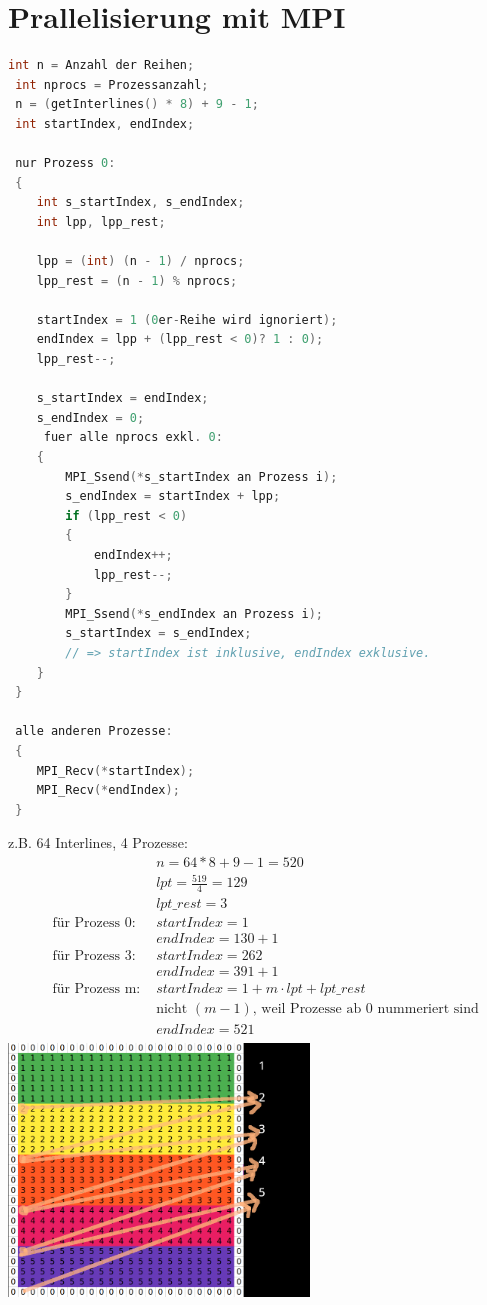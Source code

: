 \documentclass[a4paper,10pt]{article}
\begin{document}
\section{Prallelisierung mit MPI}

\begin{lstlisting}[language=C]
 int n = Anzahl der Reihen;
 int nprocs = Prozessanzahl;
 n = (getInterlines() * 8) + 9 - 1;
 int startIndex, endIndex;

 nur Prozess 0:
 {
    int s_startIndex, s_endIndex;
    int lpp, lpp_rest;

    lpp = (int) (n - 1) / nprocs;
    lpp_rest = (n - 1) % nprocs;

    startIndex = 1 (0er-Reihe wird ignoriert);
    endIndex = lpp + (lpp_rest < 0)? 1 : 0);
    lpp_rest--;

    s_startIndex = endIndex;
    s_endIndex = 0;
     fuer alle nprocs exkl. 0:
    {
        MPI_Ssend(*s_startIndex an Prozess i);
        s_endIndex = startIndex + lpp;
        if (lpp_rest < 0)
        {
            endIndex++;
            lpp_rest--;
        }
        MPI_Ssend(*s_endIndex an Prozess i);
        s_startIndex = s_endIndex;
        // => startIndex ist inklusive, endIndex exklusive.
    }
 }

 alle anderen Prozesse:
 {
    MPI_Recv(*startIndex);
    MPI_Recv(*endIndex);
 }

\end{lstlisting}

z.B. 64 Interlines, 4 Prozesse:
\begin{align*}
  & &n = 64 * 8 + 9 - 1 = 520\\
  & &lpt = \frac{519}{4} = 129 \\
  & &lpt\_rest = 3 \\
 &\text{für Prozess 0: }
 &startIndex = 1 \\
 & &endIndex = 130 + 1\\
 &\text{für Prozess 3: }
 &startIndex = 262\\
 & &endIndex = 391 + 1\\
 &\text{für Prozess m:  }
 &startIndex = 1 + m \cdot lpt + lpt\_rest \\
  & &\text{nicht $(m - 1)$, weil Prozesse ab 0 nummeriert sind}\\
 & &endIndex = 521\\
\end{align*}
\includegraphics[width=8cm]{Untitled.png}
\end{document}
